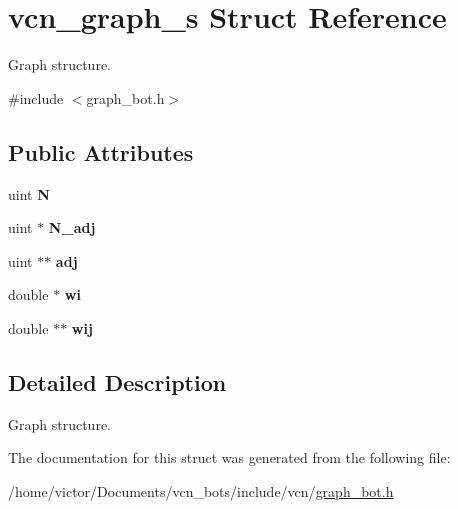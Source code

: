 \hypertarget{structvcn__graph__s}{\section{vcn\+\_\+graph\+\_\+s Struct Reference}
\label{structvcn__graph__s}
}


Graph structure.  




{\ttfamily \#include $<$graph\+\_\+bot.\+h$>$}

\subsection*{Public Attributes}
\begin{DoxyCompactItemize}
\item 
\hypertarget{structvcn__graph__s_a1e1e8fb9e07a3b9d5d2329c23d4ee698}{uint {\bfseries N}}\label{structvcn__graph__s_a1e1e8fb9e07a3b9d5d2329c23d4ee698}

\item 
\hypertarget{structvcn__graph__s_a30e5a9e68f86dbe1f3c59e8fcda94153}{uint $\ast$ {\bfseries N\+\_\+adj}}\label{structvcn__graph__s_a30e5a9e68f86dbe1f3c59e8fcda94153}

\item 
\hypertarget{structvcn__graph__s_a604f43cd65eb6b4eb8b110c57e63c8f9}{uint $\ast$$\ast$ {\bfseries adj}}\label{structvcn__graph__s_a604f43cd65eb6b4eb8b110c57e63c8f9}

\item 
\hypertarget{structvcn__graph__s_af09efb8917e010bc2c8a84496b5ca093}{double $\ast$ {\bfseries wi}}\label{structvcn__graph__s_af09efb8917e010bc2c8a84496b5ca093}

\item 
\hypertarget{structvcn__graph__s_a8684b882edbf66a68dea0225c4bdcc73}{double $\ast$$\ast$ {\bfseries wij}}\label{structvcn__graph__s_a8684b882edbf66a68dea0225c4bdcc73}

\end{DoxyCompactItemize}


\subsection{Detailed Description}
Graph structure. 

The documentation for this struct was generated from the following file\+:\begin{DoxyCompactItemize}
\item 
/home/victor/\+Documents/vcn\+\_\+bots/include/vcn/\hyperlink{graph__bot_8h}{graph\+\_\+bot.\+h}\end{DoxyCompactItemize}
